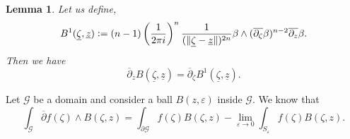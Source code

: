 \documentclass{article}
\newtheorem{lemma}{Lemma}[section]
\newcommand{\defeq}{\vcentcolon=}
\newcommand{\norm}[1]{\Vert #1 \Vert}
\newcommand{\bd}[0]{\partial}
\newcommand{\mzeta}[0]{\underline{\zeta}}
\newcommand{\mz}[0]{\underline{z}}
\begin{document}
\begin{lemma}
  Let us define,
  \begin{equation*}
    B^1(\mzeta,\mz) \defeq (n-1)\left({\frac 1 {2\pi i}}\right)^n{\frac 1 {(\norm{\mzeta-\mz})^{2n}}}\beta\wedge(\overline{\partial_\zeta}\beta)^{n-2}\overline{\partial_z}\beta.
  \end{equation*}
  Then we have 
  \begin{equation*}
    \overline{\bd}_zB(\mzeta,\mz) = \overline{\partial}_\zeta B^1(\mzeta,\mz).
  \end{equation*}
  \label{lemma_4_3}
\end{lemma}

Let $\mathcal{G}$ be a domain and consider a ball $B(z,\varepsilon)$ inside $\mathcal{G}$. We know that 
\begin{equation*}
  \int_\mathcal{G}\overline{\partial}f(\zeta)\wedge B(\zeta,z) = \int_{\bd\mathcal{G}}f(\zeta)B(\zeta,z) - \lim_{\varepsilon\to 0}\int_{S_{\varepsilon}}f(\zeta)B(\zeta,z).
\end{equation*}
\end{document}
